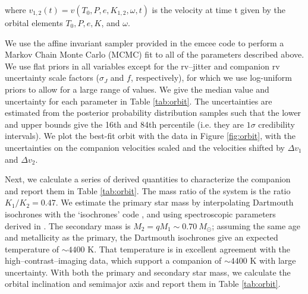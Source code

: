 \documentclass[twocolumn]{emulateapj}
\begin{document}
where $v_{1,2}(t) = v(T_0, P, e, K_{1,2}, \omega, t)$ is the velocity at time t given by the orbital elements $T_0, P, e, K$, and $\omega$.

We use the affine invariant sampler provided in the emcee code \citep{emcee} to perform a Markov Chain Monte Carlo (MCMC) fit to all of the parameters described above. We use flat priors in all variables except for the rv--jitter and companion rv uncertainty scale factors ($\sigma_J$ and $f$, respectively), for which we use log-uniform priors to allow for a large range of values.  We give the median value and uncertainty for each parameter in Table \ref{tab:orbit}. The uncertainties are estimated from the posterior probability distribution samples such that the lower and upper bounds give the 16th and 84th percentile (i.e. they are $1\sigma$ credibility intervals). We plot the best-fit orbit with the data in Figure \ref{fig:orbit}, with the uncertainties on the companion velocities scaled and the velocities shifted by $\Delta v_1$ and $\Delta v_2$. 

Next, we calculate a series of derived quantities to characterize the companion and report them in Table \ref{tab:orbit}. The mass ratio of the system is the ratio $K_1/K_2 = 0.47$. We estimate the primary star mass by interpolating Dartmouth isochrones \citep{Dotter2008} with the `isochrones' code \citep[described in][]{Montet2015}, and using spectroscopic parameters derived in \citet{Endl2015}. The secondary mass is $M_2 = qM_1 \sim 0.70\ M_{\odot}$; assuming the same age and metallicity as the primary, the Dartmouth isochrones give an expected temperature of ${\sim}4400 $ K. That temperature is in excellent agreement with the high--contrast--imaging data, which support a companion of ${\sim}4400$ K with large uncertainty. With both the primary and secondary star mass, we calculate the orbital inclination and semimajor axis and report them in Table \ref{tab:orbit}.
\end{document}
